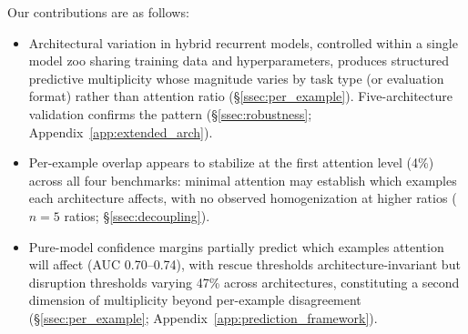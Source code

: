 Our contributions are as follows:
\begin{itemize}
    \item Architectural variation in hybrid recurrent models, controlled within a single model zoo sharing training data and hyperparameters, produces structured predictive multiplicity whose magnitude varies by task type (or evaluation format) rather than attention ratio (\S\ref{ssec:per_example}). Five-architecture validation confirms the pattern (\S\ref{ssec:robustness}; Appendix~\ref{app:extended_arch}).
    \item Per-example overlap appears to stabilize at the first attention level (4\%) across all four benchmarks: minimal attention may establish which examples each architecture affects, with no observed homogenization at higher ratios ($n = 5$ ratios; \S\ref{ssec:decoupling}).
    \item Pure-model confidence margins partially predict which examples attention will affect (AUC 0.70--0.74), with rescue thresholds architecture-invariant but disruption thresholds varying 47\% across architectures, constituting a second dimension of multiplicity beyond per-example disagreement (\S\ref{ssec:per_example}; Appendix~\ref{app:prediction_framework}).
\end{itemize}
